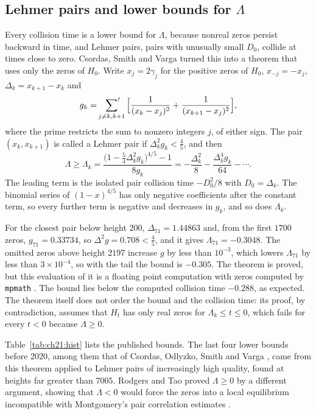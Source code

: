 \subsection{Lehmer pairs and lower bounds for \texorpdfstring{$\Lambda$}{Lambda}}\label{sec:ch21:bounds}

Every collision time is a lower bound for $\Lambda$, because nonreal zeros persist backward in time, and Lehmer pairs, pairs with unusually small $D_0$, collide at times close to zero. Csordas, Smith and Varga \cite{CSV94} turned this into a theorem that uses only the zeros of $H_0$. Write $x_j=2\gamma_j$ for the positive zeros of $H_0$, $x_{-j}=-x_j$, $\Delta_k=x_{k+1}-x_k$ and
\[
g_k=\sideset{}{'}\sum_{j\ne k,k+1}\Big[\frac1{(x_k-x_j)^2}+\frac1{(x_{k+1}-x_j)^2}\Big],
\]
where the prime restricts the sum to nonzero integers $j$, of either sign. The pair $(x_k,x_{k+1})$ is called a Lehmer pair if $\Delta_k^2g_k<\frac45$, and then \cite[Theorem 1]{CSV94}
\[
\Lambda\ge\Lambda_k=\frac{\big(1-\frac54\Delta_k^2g_k\big)^{4/5}-1}{8g_k}=-\frac{\Delta_k^2}8-\frac{\Delta_k^4g_k}{64}-\cdots.
\]
The leading term is the isolated pair collision time $-D_0^2/8$ with $D_0=\Delta_k$. The binomial series of $(1-x)^{4/5}$ has only negative coefficients after the constant term, so every further term is negative and decreases in $g_k$, and so does $\Lambda_k$.

For the closest pair below height $200$, $\Delta_{71}=1.44863$ and, from the first $1700$ zeros, $g_{71}=0.33734$, so $\Delta^2g=0.708<\frac45$, and it gives $\Lambda_{71}=-0.3048$. The omitted zeros above height $2197$ increase $g$ by less than $10^{-3}$, which lowers $\Lambda_{71}$ by less than $3\times10^{-4}$, so with the tail the bound is $-0.305$. The theorem is proved, but this evaluation of it is a floating point computation with zeros computed by \texttt{mpmath} \cite{mpmath}. The bound lies below the computed collision time $-0.288$, as expected. The theorem itself does not order the bound and the collision time: its proof, by contradiction, assumes that $H_t$ has only real zeros for $\Lambda_k\le t\le0$, which fails for every $t<0$ because $\Lambda\ge0$.

Table~\ref{tab:ch21:hist} lists the published bounds. The last four lower bounds before 2020, among them that of Csordas, Odlyzko, Smith and Varga \cite{COSV93}, came from this theorem applied to Lehmer pairs of increasingly high quality, found at heights far greater than $7005$. Rodgers and Tao proved $\Lambda\ge0$ by a different argument, showing that $\Lambda<0$ would force the zeros into a local equilibrium incompatible with Montgomery's pair correlation estimates \cite{Montgomery73}.

